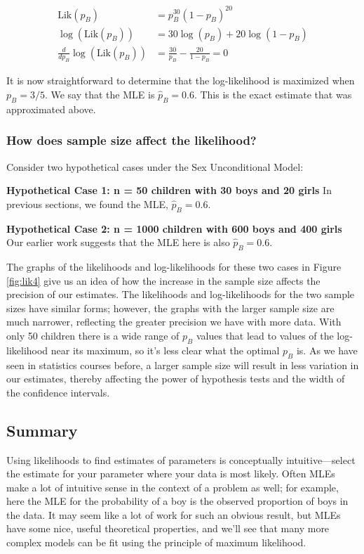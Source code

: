 \documentclass[
]{krantz}
\newcommand{\lik}{\mathrm{Lik}}
\begin{document}
\begin{align*}
 \lik(p_B)                      &= p_B^{30}(1-p_B)^{20} \\
 \log(\lik(p_B))                &= 30\log(p_B)+20\log(1-p_B) \\
 \frac{d}{dp_B} \log(\lik(p_B)) &= \frac{30}{p_B} - \frac{20}{1-p_B} = 0
 \label{eq:dlogLik50}
\end{align*}

It is now straightforward to determine that the log-likelihood is maximized when \(p_B = 3/5.\) We say that the MLE is \(\hat{p}_B = 0.6\). This is the exact estimate that was approximated above.

\hypertarget{how-does-sample-size-affect-the-likelihood}{%
\subsubsection{How does sample size affect the likelihood?}\label{how-does-sample-size-affect-the-likelihood}}

Consider two hypothetical cases under the Sex Unconditional Model:

\textbf{Hypothetical Case 1: n = 50 children with 30 boys and 20 girls} In previous sections, we found the MLE, \(\hat{p}_B=0.6.\)

\textbf{Hypothetical Case 2: n = 1000 children with 600 boys and 400 girls} Our earlier work suggests that the MLE here is also \(\hat{p}_B=0.6.\)

The graphs of the likelihoods and log-likelihoods for these two cases in Figure \ref{fig:lik4} give us an idea of how the increase in the sample size affects the precision of our estimates. The likelihoods and log-likelihoods for the two sample sizes have similar forms; however, the graphs with the larger sample size are much narrower, reflecting the greater precision we have with more data. With only 50 children there is a wide range of \(p_B\) values that lead to values of the log-likelihood near its maximum, so it's less clear what the optimal \(p_B\) is. As we have seen in statistics courses before, a larger sample size will result in less variation in our estimates, thereby affecting the power of hypothesis tests and the width of the confidence intervals.

\hypertarget{summary}{%
\subsection{Summary}\label{summary}}

Using likelihoods to find estimates of parameters is conceptually intuitive---select the estimate for your parameter where your data is most likely. Often MLEs make a lot of intuitive sense in the context of a problem as well; for example, here the MLE for the probability of a boy is the observed proportion of boys in the data. It may seem like a lot of work for such an obvious result, but MLEs have some nice, useful theoretical properties, and we'll see that many more complex models can be fit using the principle of maximum likelihood.
\end{document}
